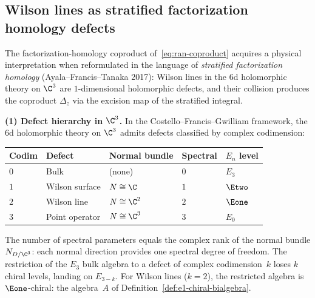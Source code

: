 \subsection{Wilson lines as stratified factorization homology defects}
\label{subsec:wilson-stratified-fh}

The factorization-homology coproduct of~\eqref{eq:ran-coproduct}
acquires a physical interpretation when reformulated in the language
of \emph{stratified factorization homology}
(Ayala--Francis--Tanaka 2017): Wilson lines in the 6d holomorphic
theory on $\C^3$ are $1$-dimensional holomorphic defects, and
their collision produces the coproduct $\Delta_z$ via the excision
map of the stratified integral.

\medskip
\noindent\textbf{(1) Defect hierarchy in $\C^3$.}
In the Costello--Francis--Gwilliam framework, the 6d holomorphic
theory on $\C^3$ admits defects classified by complex codimension:
\begin{center}
\small
\renewcommand{\arraystretch}{1.3}
\begin{tabular}{lllll}
 \toprule
 \textbf{Codim} & \textbf{Defect} & \textbf{Normal bundle} &
 \textbf{Spectral} & $E_n$ \textbf{level} \\
 \midrule
 $0$ & Bulk & (none) & $0$ & $E_3$ \\
 $1$ & Wilson surface & $N \cong \C$ & $1$ & $\Etwo$ \\
 $2$ & Wilson line & $N \cong \C^2$ & $2$ & $\Eone$ \\
 $3$ & Point operator & $N \cong \C^3$ & $3$ & $E_0$ \\
 \bottomrule
\end{tabular}
\end{center}
The number of spectral parameters equals the complex rank of the
normal bundle $N_{D/\C^3}$: each normal direction provides one
spectral degree of freedom. The restriction of the $E_3$ bulk
algebra to a defect of complex codimension~$k$ loses $k$ chiral
levels, landing on $E_{3-k}$. For Wilson lines ($k=2$), the
restricted algebra is $\Eone$-chiral: the algebra~$A$ of
Definition~\ref{def:e1-chiral-bialgebra}.


